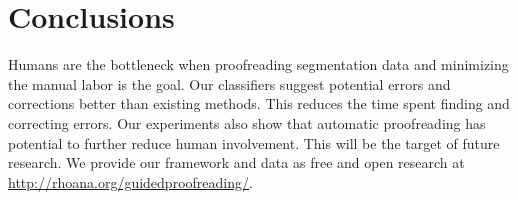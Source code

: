 \section{Conclusions}

Humans are the bottleneck when proofreading segmentation data and minimizing the manual labor is the goal. Our classifiers suggest potential errors and corrections better than existing methods. This reduces the time spent finding and correcting errors.
Our experiments also show that automatic proofreading has potential to further reduce human involvement. This will be the target of future research. We provide our framework and data as free and open research at \url{http://rhoana.org/guidedproofreading/}.


